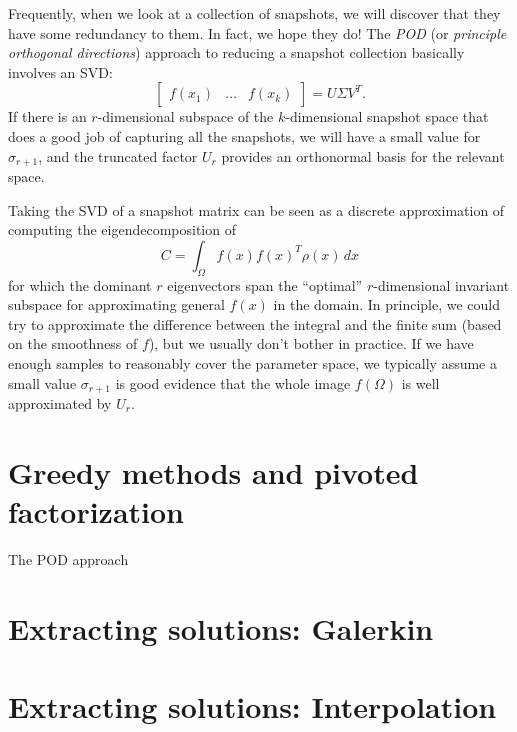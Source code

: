 \documentclass[12pt, leqno]{article} %
\begin{document}
Frequently, when we look at a collection of snapshots, we will
discover that they have some redundancy to them.  In fact, we hope
they do!  The {\em POD} (or {\em principle orthogonal directions})
approach to reducing a snapshot collection basically involves an SVD:
\[
  \begin{bmatrix} f(x_1) & \ldots & f(x_k) \end{bmatrix} = U \Sigma V^T.
\]
If there is an $r$-dimensional subspace of the $k$-dimensional
snapshot space that does a good job of capturing all the snapshots, we
will have a small value for $\sigma_{r+1}$, and the truncated factor
$U_r$ provides an orthonormal basis for the relevant space.

Taking the SVD of a snapshot matrix can be seen as a discrete
approximation of computing the eigendecomposition of
\[
  C = \int_{\Omega} f(x) f(x)^T \rho(x) \, dx
\]
for which the dominant $r$ eigenvectors span the ``optimal''
$r$-dimensional invariant subspace for approximating general $f(x)$ in
the domain.  In principle, we could try to approximate the difference
between the integral and the finite sum (based on the smoothness of
$f$), but we usually don't bother in practice.  If we have enough
samples to reasonably cover the parameter space, we typically assume a
small value $\sigma_{r+1}$ is good evidence that the whole image
$f(\Omega)$ is well approximated by $U_r$.

\section{Greedy methods and pivoted factorization}

The POD approach 

\section{Extracting solutions: Galerkin}

\section{Extracting solutions: Interpolation}

\end{document}
